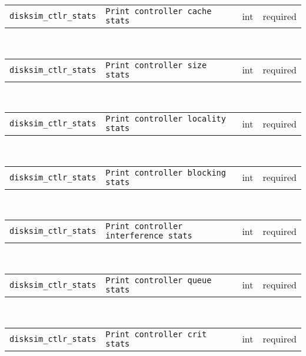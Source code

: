 \noindent 
\begin{tabular}{|p{\lpmodwidth}|p{\lpnamewidth}|p{0.5in}|p{0.5in}|}
\cline{1-4}
\texttt{disksim\_ctlr\_stats} & \texttt{Print controller cache stats} & int & required \\ 
\cline{1-4}
\end{tabular}\\ 
\noindent 
\begin{tabular}{|p{\lpmodwidth}|p{\lpnamewidth}|p{0.5in}|p{0.5in}|}
\cline{1-4}
\texttt{disksim\_ctlr\_stats} & \texttt{Print controller size stats} & int & required \\ 
\cline{1-4}
\end{tabular}\\ 
\noindent 
\begin{tabular}{|p{\lpmodwidth}|p{\lpnamewidth}|p{0.5in}|p{0.5in}|}
\cline{1-4}
\texttt{disksim\_ctlr\_stats} & \texttt{Print controller locality stats} & int & required \\ 
\cline{1-4}
\end{tabular}\\ 
\noindent 
\begin{tabular}{|p{\lpmodwidth}|p{\lpnamewidth}|p{0.5in}|p{0.5in}|}
\cline{1-4}
\texttt{disksim\_ctlr\_stats} & \texttt{Print controller blocking stats} & int & required \\ 
\cline{1-4}
\end{tabular}\\ 
\noindent 
\begin{tabular}{|p{\lpmodwidth}|p{\lpnamewidth}|p{0.5in}|p{0.5in}|}
\cline{1-4}
\texttt{disksim\_ctlr\_stats} & \texttt{Print controller interference stats} & int & required \\ 
\cline{1-4}
\end{tabular}\\ 
\noindent 
\begin{tabular}{|p{\lpmodwidth}|p{\lpnamewidth}|p{0.5in}|p{0.5in}|}
\cline{1-4}
\texttt{disksim\_ctlr\_stats} & \texttt{Print controller queue stats} & int & required \\ 
\cline{1-4}
\end{tabular}\\ 
\noindent 
\begin{tabular}{|p{\lpmodwidth}|p{\lpnamewidth}|p{0.5in}|p{0.5in}|}
\cline{1-4}
\texttt{disksim\_ctlr\_stats} & \texttt{Print controller crit stats} & int & required \\ 
\cline{1-4}
\end{tabular}\\ 
